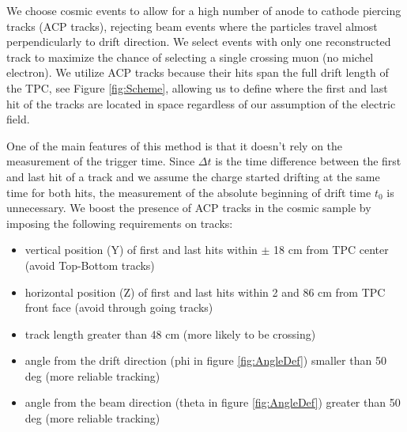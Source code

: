 We choose cosmic events to allow for a high number of anode to cathode piercing tracks (ACP tracks), rejecting  beam  events where the particles travel almost perpendicularly to drift direction. We select events with only one reconstructed track to  maximize the chance of selecting a single crossing muon (no michel electron). We utilize ACP tracks because their hits span the full drift length of the TPC, see Figure \ref{fig:Scheme}, allowing us to define where the first and last hit of the tracks are located in space regardless of our assumption of the electric field. %


One of the main features of this method is that it doesn't rely on the measurement of the trigger time. Since $\Delta t$ is the time difference between the first and last hit of a track and we assume the charge started drifting at the same time for both hits, the measurement of the absolute beginning of drift time $t_0$ is unnecessary. We boost the presence of ACP tracks in the cosmic sample by imposing the following requirements on tracks:

\begin{itemize}
\item vertical position (Y) of first and last hits within $\pm$ 18 cm from TPC center (avoid Top-Bottom tracks) 
\item horizontal position (Z) of first and last hits within 2 and 86 cm from TPC front face (avoid through going tracks) 
\item track length greater than 48 cm (more likely to be crossing)
\item angle from the drift direction (phi in figure \ref{fig:AngleDef}) smaller than 50 deg (more reliable tracking)
\item angle from the beam direction (theta in figure \ref{fig:AngleDef}) greater than 50 deg (more reliable tracking)
\end{itemize}


